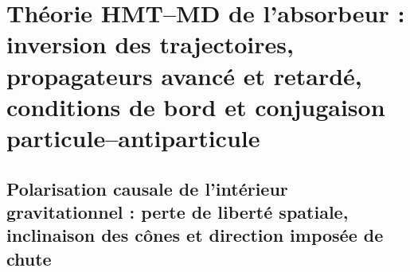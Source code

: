 \chapter{Théorie HMT--MD de l'absorbeur : inversion des trajectoires, propagateurs avancé et retardé, conditions de bord et conjugaison particule--antiparticule}
\label{chap:md-absorbedor-definitivo}
\begingroup
\let\HMTOwnerSection\section
\let\HMTOwnerSubsection\subsection
\let\HMTOwnerSubsubsection\subsubsection
\let\HMTOwnerParagraph\paragraph
\let\chapter\HMTOwnerSection
\let\section\HMTOwnerSubsection
\let\subsection\HMTOwnerSubsubsection
\let\subsubsection\HMTOwnerParagraph

\endgroup


\chapter{Polarisation causale de l'intérieur gravitationnel : perte de liberté spatiale, inclinaison des cônes et direction imposée de chute}
\label{chap:md-polarizacion-causal-interior}


